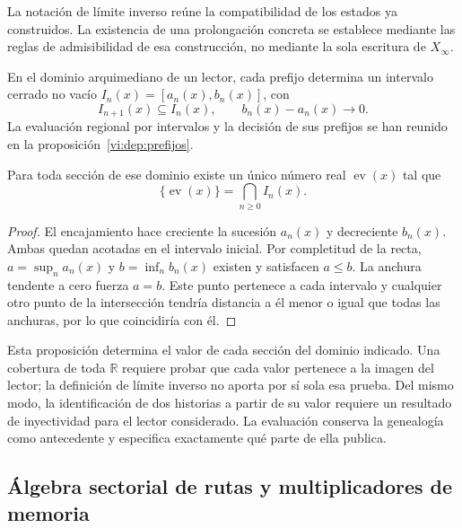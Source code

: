 La notación de límite inverso reúne la compatibilidad de los estados ya
construidos. La existencia de una prolongación concreta se establece
mediante las reglas de admisibilidad de esa construcción, no mediante la
sola escritura de \(X_\infty\).

En el dominio arquimediano de un lector, cada prefijo determina un
intervalo cerrado no vacío \(I_n(x)=[a_n(x),b_n(x)]\), con
\begin{equation}
 I_{n+1}(x)\subseteq I_n(x),\qquad
 b_n(x)-a_n(x)\longrightarrow0.
 \label{vi:hist:cilindros}
\end{equation}
La evaluación regional por intervalos y la decisión de sus prefijos se
han reunido en la proposición~\ref{vi:dep:prefijos}.

\begin{proposition}
Para toda sección de ese dominio existe un único número real
\(\operatorname{ev}(x)\) tal que
\begin{equation}
 \{\operatorname{ev}(x)\}=\bigcap_{n\ge0}I_n(x).
 \label{vi:hist:evaluacion}
\end{equation}
\end{proposition}
\begin{proof}
El encajamiento hace creciente la sucesión \(a_n(x)\) y decreciente
\(b_n(x)\). Ambas quedan acotadas en el intervalo inicial. Por
completitud de la recta, \(a=\sup_n a_n(x)\) y
\(b=\inf_n b_n(x)\) existen y satisfacen \(a\le b\).
La anchura tendente a cero fuerza \(a=b\). Este punto pertenece a cada
intervalo y cualquier otro punto de la intersección tendría distancia a
él menor o igual que todas las anchuras, por lo que coincidiría con él.
\end{proof}

Esta proposición determina el valor de cada sección del dominio indicado.
Una cobertura de toda \(\mathbb R\) requiere probar que cada valor
pertenece a la imagen del lector; la definición de límite inverso no
aporta por sí sola esa prueba. Del mismo modo, la identificación de dos
historias a partir de su valor requiere un resultado de inyectividad
para el lector considerado. La evaluación conserva la genealogía como
antecedente y especifica exactamente qué parte de ella publica.

\subsection{Álgebra sectorial de rutas y multiplicadores de memoria}
\label{vi:hist:algebra}

